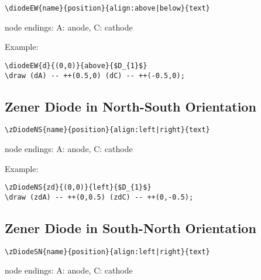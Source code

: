 \documentclass[parskip=full]{scrartcl}
\begin{document}
\begin{verbatim}
\diodeEW{name}{position}{align:above|below}{text}
\end{verbatim}
node endings: A: anode, C: cathode

Example:\\
\begin{minipage}{0.8\textwidth}
\begin{verbatim}
\diodeEW{d}{(0,0)}{above}{$D_{1}$}
\draw (dA) -- ++(0.5,0) (dC) -- ++(-0.5,0);
\end{verbatim}
\end{minipage}
\begin{minipage}{0.19\textwidth}
\end{minipage}

\subsection{Zener Diode in North-South Orientation}

\begin{verbatim}
\zDiodeNS{name}{position}{align:left|right}{text}
\end{verbatim}
node endings: A: anode, C: cathode

Example:\\
\begin{minipage}{0.8\textwidth}
\begin{verbatim}
\zDiodeNS{zd}{(0,0)}{left}{$D_{1}$}
\draw (zdA) -- ++(0,0.5) (zdC) -- ++(0,-0.5);
\end{verbatim}
\end{minipage}
\begin{minipage}{0.19\textwidth}
\end{minipage}

\subsection{Zener Diode in South-North Orientation}

\begin{verbatim}
\zDiodeSN{name}{position}{align:left|right}{text}
\end{verbatim}
node endings: A: anode, C: cathode
\end{document}
